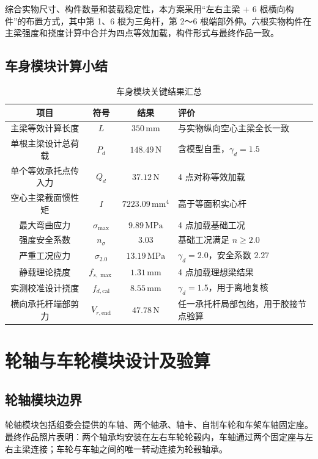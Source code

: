\documentclass[UTF8,a4paper,12pt,fontset=none]{ctexart}
\numberwithin{equation}{section}
\numberwithin{figure}{section}
\numberwithin{table}{section}
\newcommand{\mm}{\,\mathrm{mm}}
\newcommand{\Nunit}{\,\mathrm{N}}
\newcommand{\MPa}{\,\mathrm{MPa}}
\begin{document}
综合实物尺寸、构件数量和装载稳定性，本方案采用“左右主梁 + 6 根横向构件”的布置方式，其中第 1、6 根为三角杆，第 2～6 根端部外伸。六根实物构件在主梁强度和挠度计算中合并为四点等效加载，构件形式与最终作品一致。

\subsection{车身模块计算小结}
\begin{table}[H]
\centering
\caption{车身模块关键结果汇总}
\label{tab:body-summary}
\begin{tabularx}{\linewidth}{c c c Y}
\toprule
\textbf{项目} & \textbf{符号} & \textbf{结果} & \textbf{评价} \\\midrule
主梁等效计算长度 & $L$ & $350\mm$ & 与实物纵向空心主梁全长一致 \\
单根主梁设计总荷载 & $P_d$ & $148.49\Nunit$ & 含模型自重，$\gamma_d=1.5$ \\
单个等效承托点传入力 & $Q_d$ & $37.12\Nunit$ & 4 点对称等效加载 \\
空心主梁截面惯性矩 & $I$ & $7223.09\mm^4$ & 高于等面积实心杆 \\
最大弯曲应力 & $\sigma_{\max}$ & $9.89\MPa$ & 4 点加载基础工况 \\
强度安全系数 & $n_\sigma$ & $3.03$ & 基础工况满足 $n\ge2.0$ \\
严重工况应力 & $\sigma_{2.0}$ & $13.19\MPa$ & $\gamma_d=2.0$，安全系数 $2.27$ \\
静载理论挠度 & $f_{s,\max}$ & $1.31\mm$ & 4 点加载理想梁结果 \\
实测校准设计挠度 & $f_{d,\mathrm{cal}}$ & $8.55\mm$ & $\gamma_d=1.5$，用于离地复核 \\
横向承托杆端部剪力 & $V_{r,\mathrm{end}}$ & $47.78\Nunit$ & 任一承托杆局部包络，用于胶接节点验算 \\
\bottomrule
\end{tabularx}
\end{table}

\newpage
\section{轮轴与车轮模块设计及验算}

\subsection{轮轴模块边界}
轮轴模块包括组委会提供的车轴、两个轴承、轴卡、自制车轮和车架车轴固定座。最终作品照片表明：两个轴承均安装在左右车轮轮毂内，车轴通过两个固定座与左右主梁连接；车轮与车轴之间的唯一转动连接为轮毂轴承。
\end{document}
